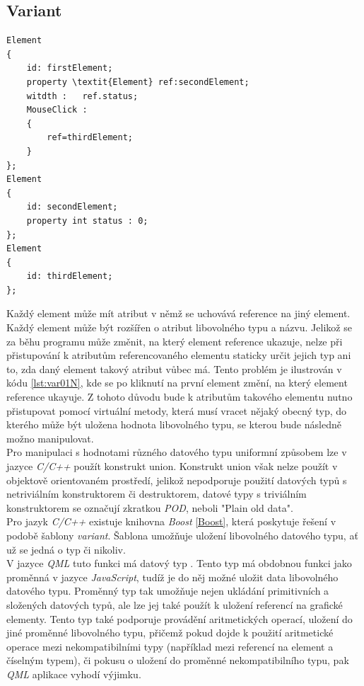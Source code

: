 \documentclass[11pt,twoside,a4paper]{book}
\begin{document}
{{\begin{ttemize}
{{\subsection {Variant}
\begin{lstlisting}[frame=single,caption=Řešení v pseudokódu problematického použití operátoru "." v přiřazovacím výroku,label=lst:lst:var01N]
Element
{
	id: firstElement;
	property \textit{Element} ref:secondElement;
	witdth :   ref.status;
	MouseClick :
	{
		ref=thirdElement;
	}
};
Element
{
	id: secondElement;
	property int status : 0;
};
Element
{
	id: thirdElement;
};
\end{lstlisting}
Každý element může mít atribut v němž se uchovává reference na jiný element. Každý element může být rozšířen o atribut libovolného typu a názvu. Jelikož se za běhu programu může změnit, na který element reference ukazuje, nelze při přistupování k atributům referencovaného elementu staticky určit jejich typ ani to, zda daný element takový atribut vůbec má. Tento problém je ilustrován v kódu \ref{lst:var01N}, kde se po kliknutí na první element změní, na který element reference ukayuje. Z tohoto důvodu bude k atributům takového elementu nutno přistupovat pomocí virtuální metody, která musí vracet nějaký obecný typ, do kterého může být uložena hodnota libovolného typu, se kterou bude následně možno manipulovat.\\
Pro manipulaci s hodnotami různého datového typu uniformní způsobem lze v jazyce \textit{C/C++} použít konstrukt union. Konstrukt union však nelze použít v objektově orientovaném prostředí, jelikož nepodporuje použití datových typů s netriviálním konstruktorem či destruktorem, datové typy s triviálním konstruktorem se označují zkratkou \textit{POD}, neboli "Plain old data".\\
Pro jazyk \textit{C/C++} existuje knihovna \textit{Boost} \ref{Boost}, která poskytuje řešení v podobě šablony \textit{variant}. Šablona  umožňuje uložení libovolného datového typu, ať už se jedná o typ  či nikoliv.\\
V jazyce \textit{QML} tuto funkci má datový typ . Tento typ má obdobnou funkci jako proměnná v jazyce \textit{JavaScript}, tudíž je do něj možné uložit data libovolného datového typu. Proměnný typ  tak umožňuje nejen ukládání primitivních a složených datových typů, ale lze jej také použít k uložení referencí na grafické elementy. Tento typ také podporuje provádění aritmetických operací, uložení do jiné proměnné libovolného typu, přičemž pokud dojde k použití aritmetické operace mezi nekompatibilními typy (například mezi referencí na element a číselným typem), či pokusu o uložení do proměnné nekompatibilního typu, pak \textit{QML} aplikace vyhodí výjimku.\\
}}
\end{ttemize}}}
\end{document}
